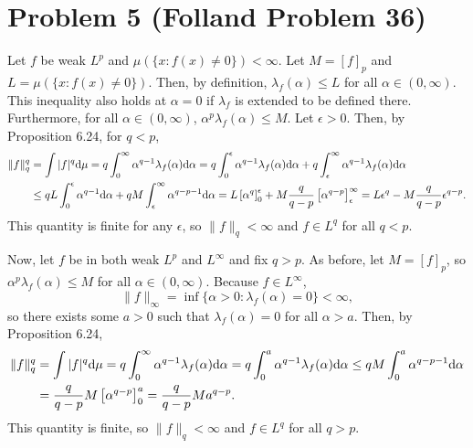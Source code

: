 \documentclass{article}
\begin{document}
\section{Problem 5 (Folland Problem 36)}
Let $f$ be weak $L^p$ and $\mu\left(\{x:f(x)\neq0\}\right)<\infty$. Let $M=[f]_p$ and $L=\mu\left(\{x:f(x)\neq0\}\right)$. Then, by definition, $\lambda_f(\alpha)\leq L$ for all $\alpha\in(0,\infty)$. This inequality also holds at $\alpha=0$ if $\lambda_f$ is extended to be defined there. Furthermore, for all $\alpha\in(0,\infty)$, $\alpha^p\lambda_f(\alpha)\leq M$. Let $\epsilon>0$. Then, by Proposition 6.24, for $q<p$,
\begin{align*}
\|f\|_q^q&=\int|f|^q\mathrm{d}\mu=q\int_0^\infty\alpha^{q-1}\lambda_f(\alpha)\mathrm{d}\alpha=q\int_0^\epsilon\alpha^{q-1}\lambda_f(\alpha)\mathrm{d}\alpha+q\int_\epsilon^\infty\alpha^{q-1}\lambda_f(\alpha)\mathrm{d}\alpha\\&\leq
qL\int_{0}^{\epsilon}\alpha^{q-1}\mathrm{d}\alpha+qM\int_\epsilon^\infty\alpha^{q-p-1}\mathrm{d}\alpha=L\left[\alpha^q\right]_0^\epsilon+M\frac{q}{q-p}\left[\alpha^{q-p}\right]_\epsilon^\infty=L\epsilon^q-M\frac{q}{q-p}\epsilon^{q-p}.
\end{align*}
This quantity is finite for any $\epsilon$, so $\|f\|_q<\infty$ and $f\in L^q$ for all $q<p$. 

Now, let $f$ be in both weak $L^p$ and $L^\infty$ and fix $q>p$. As before, let $M=[f]_p$, so $\alpha^p\lambda_f(\alpha)\leq M$ for all $\alpha\in(0,\infty)$. Because $f\in L^\infty$, 
\[
\|f\|_\infty=\inf\{\alpha>0:\lambda_f(\alpha)=0\}<\infty,
\]
so there exists some $a>0$ such that $\lambda_f(\alpha)=0$ for all $\alpha>a$. Then, by Proposition 6.24,
\begin{align*}
\|f\|_q^q&=\int|f|^q\mathrm{d}\mu=q\int_0^\infty\alpha^{q-1}\lambda_f(\alpha)\mathrm{d}\alpha=q\int_0^a\alpha^{q-1}\lambda_f(\alpha)\mathrm{d}\alpha\leq qM\int_0^a\alpha^{q-p-1}\mathrm{d}\alpha\\&=\frac{q}{q-p}M\left[\alpha^{q-p}\right]_0^a=\frac{q}{q-p}Ma^{q-p}.
\end{align*}
This quantity is finite, so $\|f\|_q<\infty$ and $f\in L^q$ for all $q>p$. 
\end{document}
